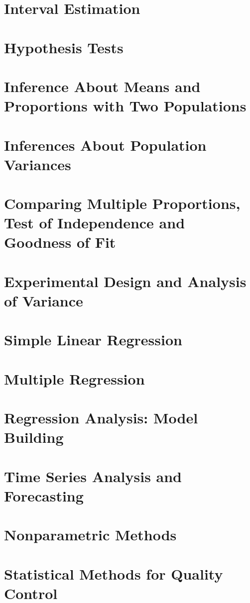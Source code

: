 \documentclass[12pt,a4paper]{report}
\begin{document}
\chapter{Interval Estimation}

\chapter{Hypothesis Tests}

\chapter{Inference About Means and Proportions with Two Populations}

\chapter{Inferences About Population Variances}

\chapter{Comparing Multiple Proportions, Test of Independence and Goodness of Fit}

\chapter{Experimental Design and Analysis of Variance}

\chapter{Simple Linear Regression}

\chapter{Multiple Regression}

\chapter{Regression Analysis: Model Building}

\chapter{Time Series Analysis and Forecasting}

\chapter{Nonparametric Methods}

\chapter{Statistical Methods for Quality Control}

\nocite{*}


\end{document}
